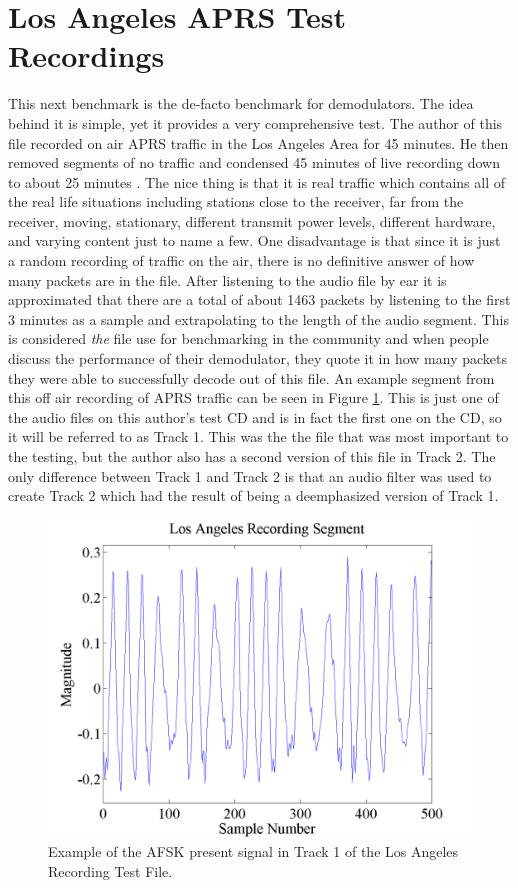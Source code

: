 \section{Los Angeles APRS Test Recordings}
This next benchmark is the de-facto benchmark for demodulators. The idea behind it is simple, yet it provides a very comprehensive test. The author of this file recorded on air APRS traffic in the Los Angeles Area for 45 minutes. He then removed segments of no traffic and condensed 45 minutes of live recording down to about 25 minutes \cite{Smith2009}. The nice thing is that it is real traffic which contains all of the real life situations including stations close to the receiver, far from the receiver, moving, stationary, different transmit power levels, different hardware, and varying content just to name a few. One disadvantage is that since it is just a random recording of traffic on the air, there is no definitive answer of how many packets are in the file. After listening to the audio file by ear it is approximated that there are a total of about 1463 packets by listening to the first 3 minutes as a sample and extrapolating to the length of the audio segment. This is considered \textit{the} file use for benchmarking in the community and when people discuss the performance of their demodulator, they quote it in how many packets they were able to successfully decode out of this file. An example segment from this off air recording of APRS traffic can be seen in Figure \ref{Track1Segment}. This is just one of the audio files on this author's test CD and is in fact the first one on the CD, so it will be referred to as Track 1. This was the the file that was most important to the testing, but the author also has a second version of this file in Track 2. The only difference between Track 1 and Track 2 is that an audio filter was used to create Track 2 which had the result of being a deemphasized version of Track 1. 
\begin{figure}
  \centering
	\includegraphics[width=0.75\linewidth]{images/LosAngelesRecordingSegment.png} 
	\caption{Example of the AFSK present signal in Track 1 of the Los Angeles Recording Test File.}
   \label{Track1Segment}
\end{figure}
